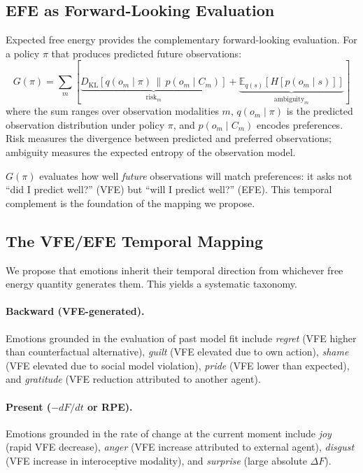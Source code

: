 \documentclass[11pt,a4paper]{article}
\begin{document}
\subsection{EFE as Forward-Looking Evaluation}\label{sec:efe}

Expected free energy provides the complementary forward-looking evaluation. For a policy $\pi$ that produces predicted future observations:
\begin{equation}
    G(\pi) = \sum_m \left[\underbrace{D_{\mathrm{KL}}[q(o_m \mid \pi) \,\|\, p(o_m \mid C_m)]}_{\text{risk}_m} + \underbrace{\mathbb{E}_{q(s)}[H[p(o_m \mid s)]]}_{\text{ambiguity}_m}\right]
\end{equation}
where the sum ranges over observation modalities $m$, $q(o_m \mid \pi)$ is the predicted observation distribution under policy $\pi$, and $p(o_m \mid C_m)$ encodes preferences. Risk measures the divergence between predicted and preferred observations; ambiguity measures the expected entropy of the observation model.

$G(\pi)$ evaluates how well \emph{future} observations will match preferences: it asks not ``did I predict well?'' (VFE) but ``will I predict well?'' (EFE). This temporal complement is the foundation of the mapping we propose.

\subsection{The VFE/EFE Temporal Mapping}\label{sec:temporal_mapping}

We propose that emotions inherit their temporal direction from whichever free energy quantity generates them. This yields a systematic taxonomy.

\paragraph{Backward (VFE-generated).} Emotions grounded in the evaluation of past model fit include \emph{regret} (VFE higher than counterfactual alternative), \emph{guilt} (VFE elevated due to own action), \emph{shame} (VFE elevated due to social model violation), \emph{pride} (VFE lower than expected), and \emph{gratitude} (VFE reduction attributed to another agent).

\paragraph{Present ($-dF/dt$ or RPE).} Emotions grounded in the rate of change at the current moment include \emph{joy} (rapid VFE decrease), \emph{anger} (VFE increase attributed to external agent), \emph{disgust} (VFE increase in interoceptive modality), and \emph{surprise} (large absolute $\Delta F$).
\end{document}
